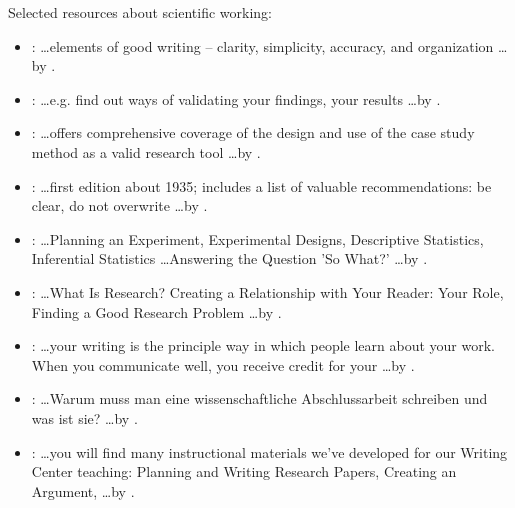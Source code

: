 Selected resources about scientific working: 
\begin{itemize}
  \item \emph{}: \ldots elements of good writing 
      -- clarity, simplicity, accuracy, and organization \ldots by 
      \cite{Zobel:2004}.
  
  \item \emph{ }: \ldots e.g. find out ways of validating your findings, your results \ldots by \cite{Shaw:2002}.
  
  
  \item \emph{}: \ldots offers comprehensive coverage of 
      the design and use of the case study method as a valid research tool 
      \ldots by \cite{Yin:2013}.

  \item \emph{}: \ldots first edition about 1935; 
      includes a list of valuable recommendations: be clear, do not overwrite 
      \ldots by \cite{Strunk:2000}.

  \item \emph{}: \ldots Planning an Experiment, 
      Experimental Designs, Descriptive Statistics, Inferential Statistics 
      \ldots Answering the Question 'So What?' \ldots by \cite{Field:2003}.

  \item \emph{}: \ldots What Is Research? Creating a 
      Relationship with Your Reader: Your Role, Finding a Good Research 
      Problem \ldots by \cite{Booth:2008}.

  \item \emph{}: \ldots your writing is the principle 
      way in which people learn about your work. When you communicate well, 
      you receive credit for your \ldots by \cite{Alley:1998}.

  \item \emph{}: \ldots Warum muss man eine 
      wissenschaftliche Abschlussarbeit schreiben und was ist sie? \ldots by 
      \cite{Eco:2010}.

  \item \emph{}: \ldots you will find many 
      instructional materials we've developed for our Writing Center 
      teaching: Planning and Writing Research Papers, Creating an Argument, 
      \ldots by \cite{Wisconsin:2004}.

\end{itemize}

